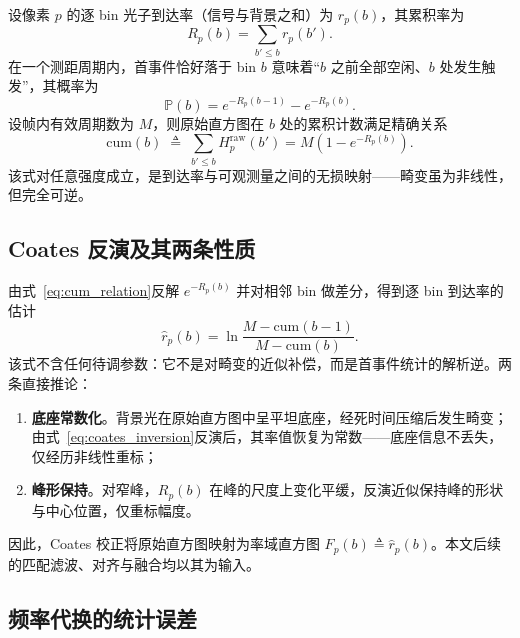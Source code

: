 \documentclass[11pt,a4paper]{ctexart}
\numberwithin{equation}{section}
\newcommand{\Pbb}{\mathbb{P}}
\begin{document}
设像素 $p$ 的逐 bin 光子到达率（信号与背景之和）为 $r_p(b)$，其累积率为
\begin{equation}
    R_p(b) = \sum_{b'\le b} r_p(b').
    \label{eq:cumulative_rate}
\end{equation}
在一个测距周期内，首事件恰好落于 bin $b$ 意味着``$b$ 之前全部空闲、$b$ 处发生触发''，其概率为
\begin{equation}
    \Pbb(b) = e^{-R_p(b-1)} - e^{-R_p(b)}.
    \label{eq:first_event_prob}
\end{equation}
设帧内有效周期数为 $M$，则原始直方图在 $b$ 处的累积计数满足精确关系
\begin{equation}
    \mathrm{cum}(b)
    \;\triangleq\;
    \sum_{b'\le b} H_p^{\mathrm{raw}}(b')
    =
    M\left(1-e^{-R_p(b)}\right).
    \label{eq:cum_relation}
\end{equation}
该式对任意强度成立，是到达率与可观测量之间的无损映射——畸变虽为非线性，但完全可逆。

\subsection{Coates 反演及其两条性质}

由式~\eqref{eq:cum_relation}反解 $e^{-R_p(b)}$ 并对相邻 bin 做差分，得到逐 bin 到达率的估计
\begin{equation}
    \boxed{
    \hat r_p(b)
    =
    \ln\frac{M-\mathrm{cum}(b-1)}
    {M-\mathrm{cum}(b)}
    }.
    \label{eq:coates_inversion}
\end{equation}
该式不含任何待调参数：它不是对畸变的近似补偿，而是首事件统计的解析逆。两条直接推论：

\begin{enumerate}
    \item \textbf{底座常数化}。背景光在原始直方图中呈平坦底座，经死时间压缩后发生畸变；由式~\eqref{eq:coates_inversion}反演后，其率值恢复为常数——底座信息不丢失，仅经历非线性重标；
    \item \textbf{峰形保持}。对窄峰，$R_p(b)$ 在峰的尺度上变化平缓，反演近似保持峰的形状与中心位置，仅重标幅度。
\end{enumerate}

因此，Coates 校正将原始直方图映射为率域直方图 $F_p(b)\triangleq\hat r_p(b)$。本文后续的匹配滤波、对齐与融合均以其为输入。

\subsection{频率代换的统计误差}
\end{document}
